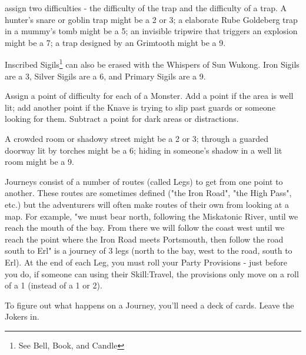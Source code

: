 {\begin{multicols}{2}
        assign two difficulties - the difficulty of  the trap and the difficulty of  a trap.  A hunter's snare or goblin trap might be a 2 or 3; a elaborate Rube Goldeberg trap in a mummy's tomb might be a 5; an invisible tripwire that triggers an explosion might be a 7; a trap designed by an Grimtooth might be a 9.

      Inscribed Sigils\footnote{See Bell, Book, and Candle} can also be erased with the Whispers of Sun Wukong. Iron Sigils are a 3, Silver Sigils are a 6, and Primary Sigils are a 9.


  
     Assign a point of difficulty for each \HD of a Monster.  Add a point if the area is well lit; add another point if the Knave is trying to slip past guards or someone looking for them.  Subtract a point for dark areas or distractions.

    A crowded room or shadowy street might be a 2 or 3; through a guarded doorway lit by torches might be a 6; hiding in someone's shadow in a well lit room might be a 9.





Journeys consist of a number of routes (called Legs) to get from one point to another.  These routes are sometimes defined ("the Iron Road", "the High Pass", etc.) but the adventurers will often make routes of their own from looking at a map.  For example, "we must bear north, following the Miskatonic River, until we reach the mouth of the bay.  From there we will follow the coast west until we reach the point where the Iron Road meets Portsmouth, then follow the road south to Erl" is a journey of 3 legs (north to the bay, west to the road, south to Erl).  At the end of each Leg, you must roll your Party Provisions \UD - just before you do, if someone can \RO using their Skill:Travel, the provisions only move \DCDOWN on a roll of a 1 (instead of a 1 or 2).

To figure out what happens on a Journey, you'll need a deck of cards.  Leave the Jokers in.


\end{multicols}}
